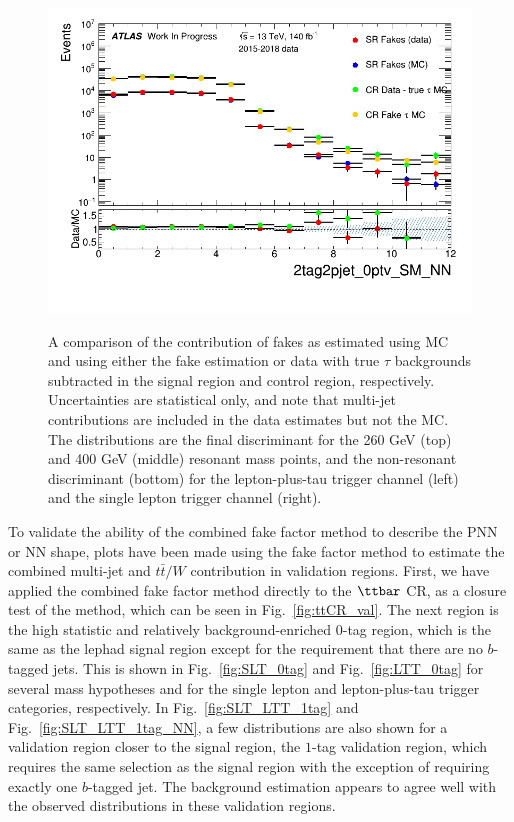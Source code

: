\begin{figure}
\includegraphics[width=.4\textwidth]{figures/lephadFF/SLT/2tag2pjet_0ptv_SM_NN_SLT_CR_highPNN_fakes_log.png}\\
\caption{A comparison of  the contribution of fakes as estimated using MC and using either the fake estimation or data with true $\tau$ backgrounds subtracted in the signal region and control region, respectively. Uncertainties are statistical only, and note that multi-jet contributions are included in the data estimates but not the MC. The distributions are the final discriminant for the 260 GeV (top) and 400 GeV (middle) resonant mass points, and the non-resonant discriminant (bottom) for the lepton-plus-tau trigger channel (left) and the single lepton trigger channel (right). }
\label{fig:LH_MC_data_fakes}
\end{figure} 

To validate the ability of the combined fake factor method to describe the PNN or NN shape, plots have been made using the fake factor method to estimate the combined multi-jet and $t\bar{t}/W$ contribution in validation regions. First, we have applied the combined fake factor method directly to the $\ttbar$ CR, as a closure test of the method, which can be seen in Fig.~\ref{fig:ttCR_val}. The next region is the high statistic and 
relatively background-enriched $0$-tag region, which is the same as the lephad signal region except for the requirement that there are 
no $b$-tagged jets.  This is shown in Fig.~\ref{fig:SLT_0tag} and Fig.~\ref{fig:LTT_0tag} for several mass hypotheses and for the single lepton and lepton-plus-tau trigger categories, respectively. In Fig.~\ref{fig:SLT_LTT_1tag} and Fig.~\ref{fig:SLT_LTT_1tag_NN}, a few distributions are also shown for a validation region closer to the signal region, the $1$-tag validation region, which requires the same selection as the signal region with the exception of requiring exactly one $b$-tagged jet. The background estimation appears to agree well with the observed distributions in these validation regions.

